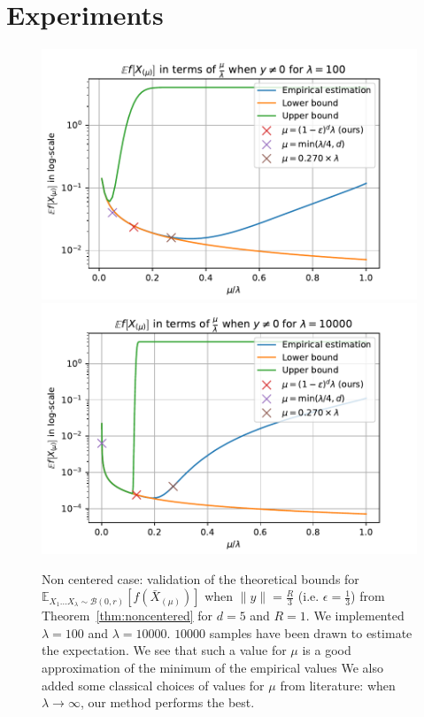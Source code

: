 
\section{Experiments}
\begin{figure}[t]
    \centering
    \includegraphics[width=.45\textwidth]{sections/appendix/ppsn2020-kbest/imgs/n=100.pdf}
    \includegraphics[width=.45\textwidth]{sections/appendix/ppsn2020-kbest/imgs/n=10000.pdf}
    \caption{Non centered  case: validation of the theoretical bounds for $\mathbb{E}_{X_1...X_\lambda\sim\mathcal{B}(0,r)}\left[ f(\bar X_{(\mu)})\right]$ when $\rVert y\rVert =\frac{R}{3}$ (i.e. $\epsilon=\frac{1}{3}$) from Theorem~\ref{thm:noncentered} for $d=5$ and $R=1$. We implemented $\lambda=100$ and $\lambda=10000$. $10000$  samples have been drawn to estimate the expectation. We see that such a value for $\mu$ is a good approximation of the minimum of the empirical values We also added some classical choices of values for $\mu$ from literature: when $\lambda\rightarrow\infty$, our method performs the best.}
    \label{fig:exp_th_nc}
\end{figure}


